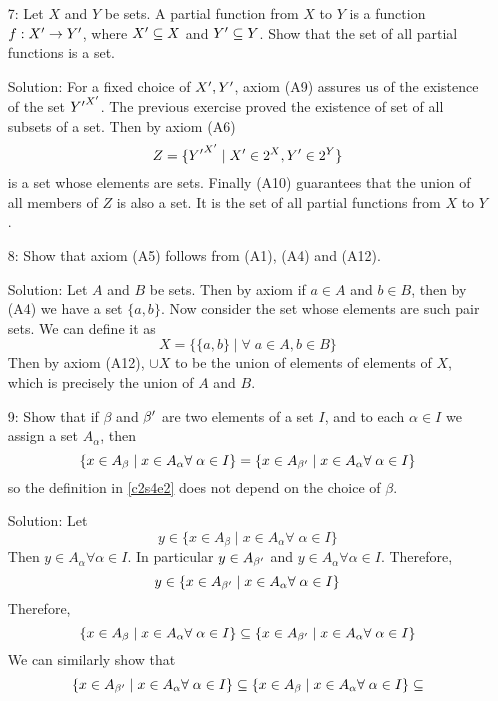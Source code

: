 \begin{enumerate}
\item[7:] Let $X$ and $Y$ be sets. A partial function from $X$ to $Y$ is
a function $f: X^\prime \rightarrow Y^\prime$, where $X^\prime \subseteq X$ and
$Y^\prime \subseteq Y$. Show that the set of all partial functions is a set.
\item[Solution:] For a fixed choice of $X^\prime, Y^\prime$, axiom (A9) assures
us of the existence of the set ${Y^\prime}^{X^\prime}$. The previous exercise
proved the existence of set of all subsets of a set. Then by axiom (A6)
\[
Z = \{{Y^\prime}^{X^\prime} \;|\; X^\prime \in 2^X, Y^\prime \in 2^Y\}
\]
is a set whose elements are sets. Finally (A10) guarantees that the union
of all members of $Z$ is also a set. It is the set of all partial functions
from $X$ to $Y$.

\item[8:] Show that axiom (A5) follows from (A1), (A4) and (A12).
\item[Solution:] Let $A$ and $B$ be sets. Then by axiom if $a \in A$ and
$b \in B$, then by (A4) we have a set $\{a, b\}$. Now consider the set
whose elements are such pair sets. We can define it as
\[
X = \{ \{a, b\} \;|\; \forall\; a \in A, b \in B\}
\]
Then by axiom (A12), $\cup X$ to be the union of elements of elements of 
$X$, which is precisely the union of $A$ and $B$.

\item[9:] Show that if $\beta$ and $\beta^\prime$ are two elements of a set
$I$, and to each $\alpha \in I$ we assign a set $A_\alpha$, then
\[
\{x \in A_\beta \;|\; x \in A_\alpha \forall\; \alpha \in I\} =
\{x \in A_{\beta^\prime} \;|\; x \in A_\alpha \forall\; \alpha \in I\}
\]
so the definition in \eqref{c2s4e2} does not depend on the choice of 
$\beta$.
\item[Solution:] Let 
\[
y \in \{x \in A_\beta \;|\; x \in A_\alpha \forall\; \alpha \in I\}
\]
Then $y \in A_\alpha \forall \alpha \in I$. In particular $y \in 
A_{\beta^\prime}$ and $y \in A_\alpha \forall \alpha \in I$. Therefore,
\[
y \in \{x \in A_{\beta^\prime} \;|\; x \in A_\alpha \forall\; \alpha \in I\}
\]
Therefore,
\[
\{x \in A_\beta \;|\; x \in A_\alpha \forall\; \alpha \in I\} \subseteq
\{x \in A_{\beta^\prime} \;|\; x \in A_\alpha \forall\; \alpha \in I\}
\]
We can similarly show that
\[
\{x \in A_{\beta^\prime} \;|\; x \in A_\alpha \forall\; \alpha \in I\} 
\subseteq
\{x \in A_\beta \;|\; x \in A_\alpha \forall\; \alpha \in I\} \subseteq
\]


\end{enumerate}

